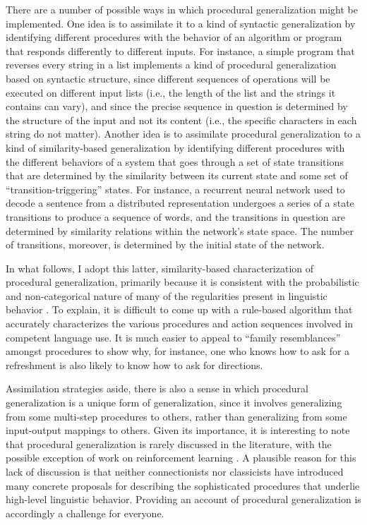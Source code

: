 There are a number of possible ways in which procedural generalization might be implemented. One idea is to assimilate it to a kind of syntactic generalization by identifying different procedures with the behavior of an algorithm or program that responds differently to different inputs. For instance, a simple program that reverses every string in a list implements a kind of procedural generalization based on syntactic structure, since different sequences of operations will be executed on different input lists (i.e., the length of the list and the strings it contains can vary), and since the precise sequence in question is determined by the structure of the input and not its content (i.e., the specific characters in each string do not matter). Another idea is to assimilate procedural generalization to a kind of similarity-based generalization by identifying different procedures with the different behaviors of a system that goes through a set of state transitions that are determined by the similarity between its current state and some set of ``transition-triggering'' states. For instance, a recurrent neural network used to decode a sentence from a distributed representation undergoes a series of a state transitions to produce a sequence of words, and the transitions in question are determined by similarity relations within the network's state space. The number of transitions, moreover, is determined by the initial state of the network.

In what follows, I adopt this latter, similarity-based characterization of procedural generalization, primarily because it is consistent with the probabilistic and non-categorical nature of many of the regularities present in linguistic behavior \citep{Seidenberg:1997,Manning:2015}. To explain, it is difficult to come up with a rule-based algorithm that accurately characterizes the various procedures and action sequences involved in competent language use. It is much easier to appeal to ``family resemblances'' \citep{Wittgenstein:1953} amongst procedures to show why, for instance, one who knows how to ask for a refreshment is also likely to know how to ask for directions.

Assimilation strategies aside, there is also a sense in which procedural generalization is a unique form of generalization, since it involves generalizing from some multi-step procedures to others, rather than generalizing from some input-output mappings to others. Given its importance, it is interesting to note that procedural generalization is rarely discussed in the literature, with the possible exception of work on reinforcement learning \citep[e.g.,][]{Mnih:2015,Eliasmith:2012}. A plausible reason for this lack of discussion is that neither connectionists nor classicists have introduced many concrete proposals for describing the sophisticated procedures that underlie high-level linguistic behavior. Providing an account of procedural generalization is accordingly a challenge for everyone. 

